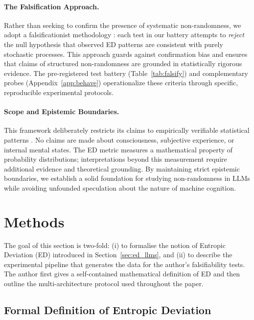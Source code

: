 \documentclass[12pt]{article}
\begin{document}
\paragraph{The Falsification Approach.}
Rather than seeking to confirm the presence of systematic non-randomness, we adopt a falsificationist methodology \citep{clark2021transformer}: each test in our battery attempts to \emph{reject} the null hypothesis that observed ED patterns are consistent with purely stochastic processes. This approach guards against confirmation bias and ensures that claims of structured non-randomness are grounded in statistically rigorous evidence. The pre-registered test battery (Table~\ref{tab:falsify}) and complementary probes (Appendix~\ref{app:behave}) operationalize these criteria through specific, reproducible experimental protocols.

\paragraph{Scope and Epistemic Boundaries.}
This framework deliberately restricts its claims to empirically verifiable statistical patterns \citep{zhang2023illusion, schmidhuber2023emergence}. No claims are made about consciousness, subjective experience, or internal mental states. The ED metric measures a mathematical property of probability distributions; interpretations beyond this measurement require additional evidence and theoretical grounding. By maintaining strict epistemic boundaries, we establish a solid foundation for studying non-randomness in LLMs while avoiding unfounded speculation about the nature of machine cognition.


\section{Methods}\label{sec:methods}
The goal of this section is two-fold:
(i) to formalise the notion of Entropic Deviation (ED) introduced in Section~\ref{sec:ed_llms}, and (ii) to describe the experimental pipeline that generates the data for the author's falsifiability tests.
The author first gives a self-contained mathematical definition of ED and then outline the multi-architecture protocol used throughout the paper.

\subsection{Formal Definition of Entropic Deviation}
\end{document}
